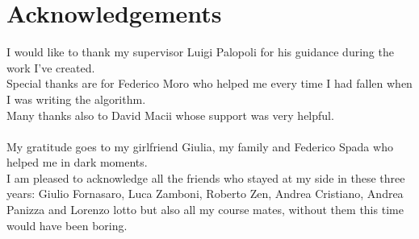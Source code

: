 \chapter*{Acknowledgements}
\thispagestyle{empty}

I would like to thank my supervisor Luigi Palopoli for his guidance during the work I've created.
\\
Special thanks are for Federico Moro who helped me every time I had fallen when I was writing the algorithm.
\\
Many thanks also to David Macii whose support was very helpful.
\\ \\
My gratitude goes to my girlfriend Giulia, my family and Federico Spada who helped me in dark moments.
\\
I am pleased to acknowledge all the friends who stayed at my side in these three years:
Giulio Fornasaro, Luca Zamboni, Roberto Zen, Andrea Cristiano, Andrea Panizza and Lorenzo lotto but also all my course mates, without them this time would have been boring.

